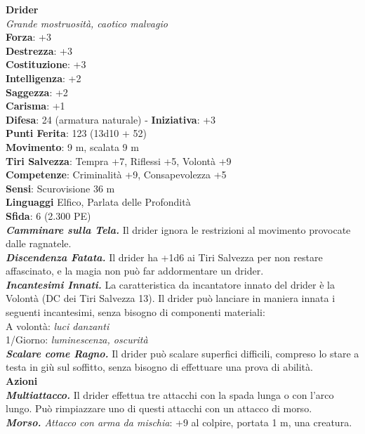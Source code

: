 \begin{multicols}{2}
\medskip\textbf{Drider}\\
\emph{Grande mostruosità, caotico malvagio}\\
\textbf{Forza}: +3\\
\textbf{Destrezza}: +3\\
\textbf{Costituzione}: +3\\
\textbf{Intelligenza}: +2\\
\textbf{Saggezza}: +2\\
\textbf{Carisma}: +1\\
\textbf{Difesa}: 24 (armatura naturale) - \textbf{Iniziativa}: +3\\
\textbf{Punti Ferita}: 123 (13d10 + 52)\\
\textbf{Movimento}: 9 m, scalata 9 m\\
\textbf{Tiri Salvezza}: Tempra +7, Riflessi +5, Volontà +9\\
\textbf{Competenze}: Criminalità +9, Consapevolezza +5\\
\textbf{Sensi}: Scurovisione 36 m\\
\textbf{Linguaggi} Elfico, Parlata delle Profondità\\
\textbf{Sfida}: 6 (2.300 PE)\smallskip\\
\emph{\textbf{Camminare sulla Tela.}} Il drider ignora le restrizioni al movimento provocate dalle ragnatele.\\
\emph{\textbf{Discendenza Fatata.}} Il drider ha +1d6 ai Tiri Salvezza per non restare affascinato, e la magia non può far addormentare un drider.\\
\emph{\textbf{Incantesimi Innati.}} La caratteristica da incantatore innato del drider è la Volontà (DC dei Tiri Salvezza 13). Il drider può lanciare in maniera innata i seguenti incantesimi, senza bisogno  di componenti materiali:\\
A volontà: \emph{luci danzanti}\\
1/Giorno: \emph{luminescenza, oscurità}\\
\emph{\textbf{Scalare come Ragno.}} Il drider può scalare superfici difficili, compreso lo stare a testa in giù sul soffitto, senza bisogno di effettuare una prova di abilità.\\
\smallskip\textbf{Azioni}\\
\emph{\textbf{Multiattacco.}} Il drider effettua tre attacchi con la spada lunga o con l'arco lungo. Può rimpiazzare uno di questi attacchi con un attacco di morso.\\
\emph{\textbf{Morso.} Attacco con arma da mischia}: +9 al colpire, portata 1 m, una creatura.\\

\end{multicols}
